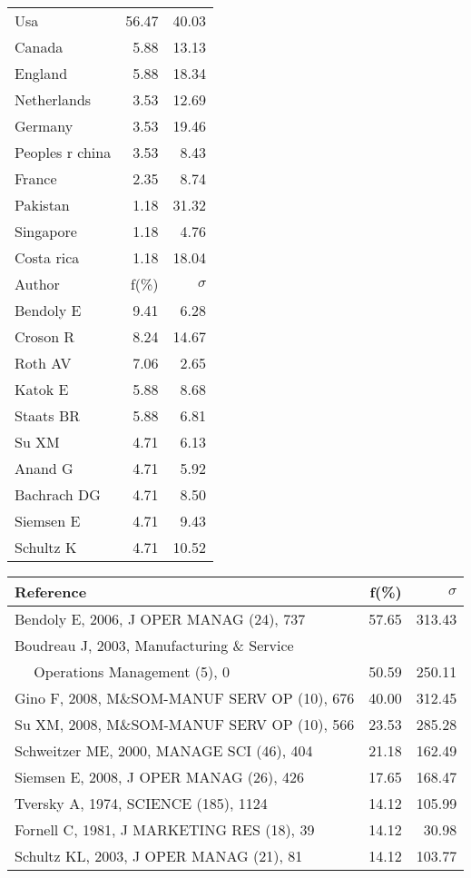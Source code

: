 \documentclass[a4paper,11pt]{report}
\begin{document}
\begin{landscape}
\begin{table}[!ht]
{\begin{tabular}{|l r r|}
\hline
Usa & 56.47 & 40.03\\
Canada & 5.88 & 13.13\\
England & 5.88 & 18.34\\
Netherlands & 3.53 & 12.69\\
Germany & 3.53 & 19.46\\
Peoples r china & 3.53 & 8.43\\
France & 2.35 & 8.74\\
Pakistan & 1.18 & 31.32\\
Singapore & 1.18 & 4.76\\
Costa rica & 1.18 & 18.04\\
\hline
\hline
Author & f(\%) & $\sigma$\\
\hline
Bendoly E & 9.41 & 6.28\\
Croson R & 8.24 & 14.67\\
Roth AV & 7.06 & 2.65\\
Katok E & 5.88 & 8.68\\
Staats BR & 5.88 & 6.81\\
Su XM & 4.71 & 6.13\\
Anand G & 4.71 & 5.92\\
Bachrach DG & 4.71 & 8.50\\
Siemsen E & 4.71 & 9.43\\
Schultz K & 4.71 & 10.52\\
\hline
\end{tabular}
}
{\scriptsize\begin{tabular}{|l r r|}
\hline
Reference & f(\%) & $\sigma$\\
\hline
Bendoly E, 2006, J OPER MANAG (24), 737 & 57.65 & 313.43\\
Boudreau J, 2003, Manufacturing \& Service &  & \\
$\quad$ Operations Management (5), 0 & 50.59 & 250.11\\
Gino F, 2008, M\&SOM-MANUF SERV OP (10), 676 & 40.00 & 312.45\\
Su XM, 2008, M\&SOM-MANUF SERV OP (10), 566 & 23.53 & 285.28\\
Schweitzer ME, 2000, MANAGE SCI (46), 404 & 21.18 & 162.49\\
Siemsen E, 2008, J OPER MANAG (26), 426 & 17.65 & 168.47\\
Tversky A, 1974, SCIENCE (185), 1124 & 14.12 & 105.99\\
Fornell C, 1981, J MARKETING RES (18), 39 & 14.12 & 30.98\\
Schultz KL, 2003, J OPER MANAG (21), 81 & 14.12 & 103.77\\

\end{tabular}}
\end{table}
\end{landscape}
\end{document}
